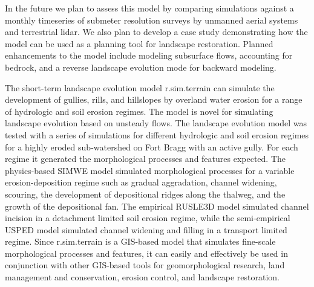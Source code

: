 \documentclass[gmd, manuscript]{copernicus}
\begin{document}

In the future we plan to assess this model
by comparing simulations against 
a monthly timeseries
of submeter resolution surveys
by unmanned aerial systems and terrestrial lidar. 
We also plan to develop a case study demonstrating
how the model can be used as a planning tool 
for landscape restoration. 
Planned enhancements to the model include 
modeling subsurface flows, 
accounting for bedrock, 
and a reverse landscape evolution mode
for backward modeling. 

\conclusions

The short-term landscape evolution model 
r.sim.terrain can simulate the development of 
gullies, rills, and hillslopes by overland water erosion
for a range of hydrologic and soil erosion regimes.
The model is novel for simulating landscape evolution
based on unsteady flows. 
The landscape evolution model was tested
with a series of simulations for different 
hydrologic and soil erosion regimes
for a highly eroded sub-watershed on Fort Bragg
with an active gully.
For each regime it generated the 
morphological processes and features expected.
The physics-based SIMWE model 
simulated morphological processes 
for a variable erosion-deposition regime such as 
gradual aggradation, channel widening, 
scouring, the development of
depositional ridges along the thalweg,
and the growth of the depositional fan.
The empirical RUSLE3D model simulated channel incision
in a detachment limited soil erosion regime,
while the semi-empirical USPED model
simulated channel widening and filling
in a transport limited regime. 
Since r.sim.terrain is a GIS-based model that simulates 
fine-scale morphological processes and features,
it can easily and effectively be used 
in conjunction with other GIS-based tools
for geomorphological research,
land management and conservation,
erosion control, and landscape restoration. 
\end{document}
